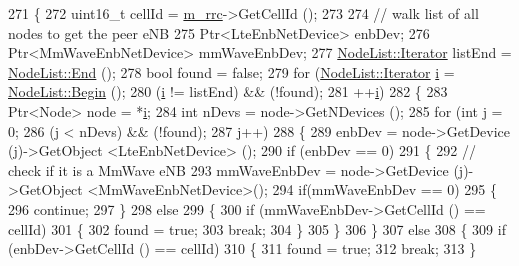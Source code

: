 \begin{DoxyCode}
271 \{
272   uint16\_t cellId = \hyperlink{classns3_1_1MmWaveLteUeRrcProtocolReal_a367394139f43585b3d9acd65d7a44863}{m\_rrc}->GetCellId ();
273 
274   \textcolor{comment}{// walk list of all nodes to get the peer eNB}
275   Ptr<LteEnbNetDevice> enbDev;
276   Ptr<MmWaveEnbNetDevice> mmWaveEnbDev;
277   \hyperlink{classns3_1_1NodeList_a9e2679a94efb4f0066cc21e65440364d}{NodeList::Iterator} listEnd = \hyperlink{classns3_1_1NodeList_a027a558c16e6078e25c7ffc67becb559}{NodeList::End} ();
278   \textcolor{keywordtype}{bool} found = \textcolor{keyword}{false};
279   \textcolor{keywordflow}{for} (\hyperlink{classns3_1_1NodeList_a9e2679a94efb4f0066cc21e65440364d}{NodeList::Iterator} \hyperlink{bernuolliDistribution_8m_a6f6ccfcf58b31cb6412107d9d5281426}{i} = \hyperlink{classns3_1_1NodeList_a93d2211831f5cb71d1dbb721e2721d7f}{NodeList::Begin} (); 
280        (\hyperlink{bernuolliDistribution_8m_a6f6ccfcf58b31cb6412107d9d5281426}{i} != listEnd) && (!found); 
281        ++\hyperlink{bernuolliDistribution_8m_a6f6ccfcf58b31cb6412107d9d5281426}{i})
282     \{
283       Ptr<Node> node = *\hyperlink{bernuolliDistribution_8m_a6f6ccfcf58b31cb6412107d9d5281426}{i};
284       \textcolor{keywordtype}{int} nDevs = node->GetNDevices ();
285       \textcolor{keywordflow}{for} (\textcolor{keywordtype}{int} j = 0; 
286            (j < nDevs) && (!found);
287            j++)
288         \{
289           enbDev = node->GetDevice (j)->GetObject <LteEnbNetDevice> ();
290           \textcolor{keywordflow}{if} (enbDev == 0)
291             \{
292               \textcolor{comment}{// check if it is a MmWave eNB}
293               mmWaveEnbDev = node->GetDevice (j)->GetObject <MmWaveEnbNetDevice>();
294               \textcolor{keywordflow}{if}(mmWaveEnbDev == 0)
295               \{
296                  \textcolor{keywordflow}{continue};                
297               \}  
298               \textcolor{keywordflow}{else} 
299               \{
300                 \textcolor{keywordflow}{if} (mmWaveEnbDev->GetCellId () == cellId)
301                 \{
302                   found = \textcolor{keyword}{true};          
303                   \textcolor{keywordflow}{break};
304                 \}   
305               \}
306             \}
307           \textcolor{keywordflow}{else}
308             \{
309               \textcolor{keywordflow}{if} (enbDev->GetCellId () == cellId)
310                 \{
311                   found = \textcolor{keyword}{true};          
312                   \textcolor{keywordflow}{break};
313                 \}

\end{DoxyCode}
